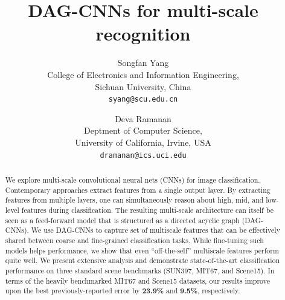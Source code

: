 \documentclass[10pt,twocolumn,letterpaper]{article}
\begin{document}
\title{DAG-CNNs for multi-scale recognition}

\author{Songfan Yang\\
College of Electronics and Information Engineering,\\
Sichuan University, China\\
{\tt\small syang@scu.edu.cn}
\and
Deva Ramanan\\
Deptment of Computer Science,\\
University of California, Irvine, USA\\
{\tt\small dramanan@ics.uci.edu}
}

\maketitle

\begin{abstract}
We explore multi-scale convolutional neural nets (CNNs) for image classification. Contemporary approaches extract features from a single output layer. By extracting features from multiple layers, one can simultaneously reason about high, mid, and low-level features during classification. The resulting multi-scale architecture can itself be seen as a feed-forward model that is structured as a directed acyclic graph (DAG-CNNs). %
We use DAG-CNNs to capture set of multiscale features that can be effectively shared between coarse and fine-grained classification tasks. While fine-tuning such models helps performance, we show that even ``off-the-self'' multiscale features perform quite well. We present extensive analysis and demonstrate state-of-the-art classification performance on three standard scene benchmarks (SUN397, MIT67, and Scene15). %
In terms of the heavily benchmarked MIT67 and Scene15 datasets, our results improve upon the best previously-reported error by {\bf 23.9\%} and {\bf 9.5\%}, respectively.
\end{abstract}
\end{document}
